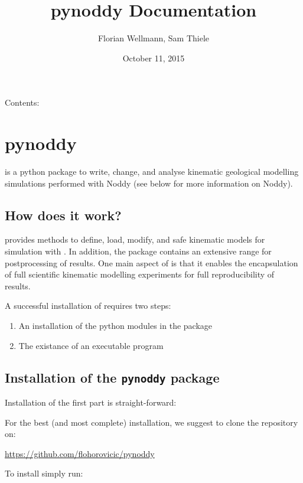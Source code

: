 \documentclass[a4paper,10pt,english]{sphinxmanual}
\title{pynoddy Documentation}
\date{October 11, 2015}
\author{Florian Wellmann, Sam Thiele}
\begin{document}
\maketitle
\tableofcontents
{}\label{index::doc}


Contents:


\chapter{pynoddy}
\label{readme:welcome-to-pynoddy-s-documentation}\label{readme::doc}\label{readme:pynoddy}
 is a python package to write, change, and analyse kinematic
geological modelling simulations performed with Noddy (see below for
more information on Noddy).


\section{How does it work?}
\label{readme:how-does-it-work}
 provides methods to define, load, modify, and safe kinematic
models for simulation with . In addition, the package contains
an extensive range for postprocessing of results. One main aspect of
 is that it enables the encapsulation of full scientific
kinematic modelling experiments for full reproducibility of results.

A successful installation of  requires two steps:
\begin{enumerate}
\item {} 
An installation of the python modules in the package 

\item {} 
The existance of an executable  program

\end{enumerate}


\section{Installation of the \texttt{pynoddy} package}
\label{readme:installation-of-the-pynoddy-package}
Installation of the first part is straight-forward:

For the best (and most complete) installation, we suggest to clone the
 repository on:

\href{https://github.com/flohorovicic/pynoddy}{https://github.com/flohorovicic/pynoddy}

To install  simply run:
\end{document}
